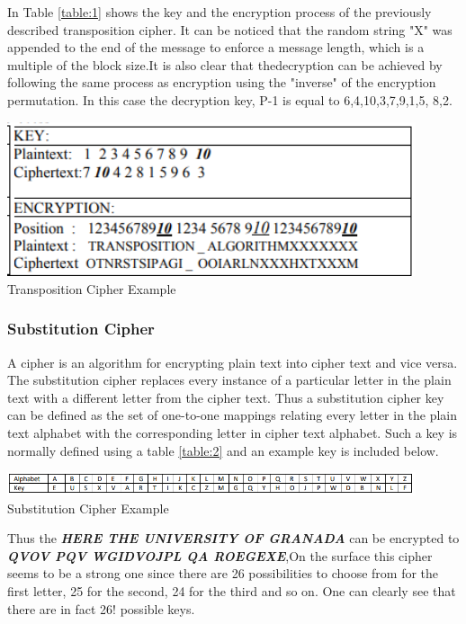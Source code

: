 In Table \ref{table:1} shows the key and the encryption process of the previously described transposition cipher. It can be noticed that the random string "X" was appended to the end of the message to enforce a message length, which is a multiple of the block size.It is also clear that thedecryption can be achieved by following the same process as encryption using the "inverse" of the encryption permutation. In this case the decryption key, P-1 is equal to {6,4,10,3,7,9,1,5, 8,2}.

\begin{table}[h!]
\includegraphics[width=0.9\textwidth]{imagenes/Transposition.png}\\
\caption{Transposition Cipher Example}
\label{table:1}
\end{table}
\newpage
\subsubsection{Substitution Cipher}
A cipher is an algorithm for encrypting plain text into cipher text and vice versa. The substitution cipher replaces every instance of a particular letter in the plain text with a different letter from the cipher text. Thus a substitution cipher key can be defined as the set of one-to-one mappings relating every letter in the plain text alphabet with the corresponding letter in cipher text alphabet. Such a key is normally defined using a table \ref{table:2}  and an example key is included below.
\begin{table}[h!]
\includegraphics[width=0.9\textwidth]{imagenes/substitustion.png}\\
\caption{Substitution Cipher Example}
\label{table:2}
\end{table}

Thus the \textit{\textbf{HERE THE UNIVERSITY OF GRANADA}} can be encrypted to \textit{\textbf{QVOV PQV WGIDVOJPL QA ROEGEXE}},On the surface this cipher seems to be a strong one since there are 26 possibilities to choose from for the
first letter, 25 for the second, 24 for the third and so on. One can clearly see that there are in fact 26!
possible keys. 

